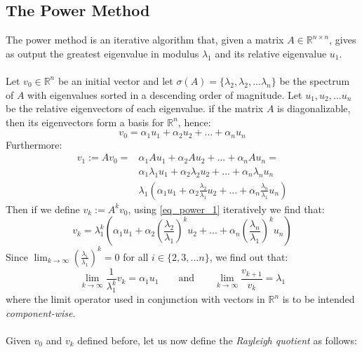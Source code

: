 \subsection*{The Power Method}
The power method is an iterative algorithm that, given a matrix \(A\in\mathbb{R}^{n \times n}\), gives as output the greatest eigenvalue in modulus \(\lambda_1\) and its relative eigenvalue \(u_1\).\\
\\
Let \(v_0\in \mathbb{R}^n\) be an initial vector and let \(\sigma(A) = \{\lambda_2, \lambda_2, ... \lambda_n\}\) be the spectrum of \(A\) with eigenvalues sorted in a descending order of magnitude. Let \(u_1, u_2, ... u_n\) be the relative eigenvectors of each eigenvalue. if the matrix \(A\) is diagonalizable, then its eigenvectors form a basis for \(\mathbb{R}^n\), hence:
\begin{equation*}
    v_0= \alpha_1 u_1 + \alpha_2 u_2 + ... + \alpha_n u_n 
\end{equation*}
Furthermore:
\begin{align} \label{eq_power_1}
    v_1 := A v_0 = & \alpha_1 A u_1 + \alpha_2 A u_2 + ... + \alpha_n  A u_n = \\
    & \alpha_1 \lambda_1 u_1 + \alpha_2 \lambda_2 u_2 + ... + \alpha_n  \lambda_n u_n \\
    & \lambda_1 \left(\alpha_1 u_1 + \alpha_2 \frac{\lambda_2}{\lambda_1} u_2 + ... + \alpha_n  \frac{\lambda_n}{\lambda_1} u_n\right)
\end{align}
Then if we define \(v_k := A^k v_0\), using \ref{eq_power_1} iteratively we find that:
\begin{equation}\label{eq_power_3}
    v_k = \lambda_1^k \left(\alpha_1 u_1 + \alpha_2 \left(\frac{\lambda_2}{\lambda_1}\right)^k u_2 + ... + \alpha_n  \left(\frac{\lambda_n}{\lambda_1}\right)^k u_n\right)
\end{equation}
Since \(\lim_{k \to \infty} \left(\frac{\lambda_i}{\lambda_1}\right)^k = 0\) for all \(i \in \{2, 3, ... n\}\), we find out that:
\begin{equation} \label{eq_power_2}
    \lim_{k \to \infty} \frac{1}{\lambda_1^k} v_k = \alpha_1 u_1 \quad \quad  \text{and} \quad \quad \lim_{k \to \infty} \frac{v_{k+1}}{v_k} = \lambda_1
\end{equation}
where the limit operator used in conjunction with vectors in \(\mathbb{R}^n\) is to be intended \textit{component-wise}.
\\
\\
Given \(v_0\) and \(v_k\) defined before, let us now define the \textit{Rayleigh quotient} as follows:
